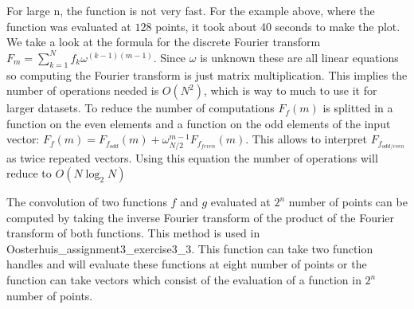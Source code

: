 \documentclass[12pt]{article}
\begin{document}
For large n, the function is not very fast. For the example above, where the function was evaluated at $128$ points, it took about 40 seconds to make the plot. We take a look at the formula for the discrete Fourier transform $F_m = \sum_{k=1}^{N}f_k\omega^{(k-1)(m-1)}$. Since $\omega$ is unknown these are all linear equations so computing the Fourier transform is just matrix multiplication. This implies the number of operations needed is $O(N^2)$, which is way to much to use it for larger datasets. To reduce the number of computations $F_f(m)$ is splitted in a function on the even elements and a function on the odd elements of the input vector: $F_f(m) = F_{f_{odd}}(m) + \omega_{N/2}^{m-1}F_{f_{feven}}(m).$ This allows to interpret $F_{f_{odd/even}}$ as twice repeated vectors. Using this equation the number of operations will reduce to $O(N \log_2 N)$

The convolution of two functions $f$ and $g$ evaluated at $2^n$ number of points can be computed by taking the inverse Fourier transform of the product of the Fourier transform of both functions. This method is used in Oosterhuis\_assignment3\_exercise3\_3. This function can take two function handles and will evaluate these functions at eight number of points or the function can take vectors which consist of the evaluation of a function in $2^n$ number of points.
\end{document}
